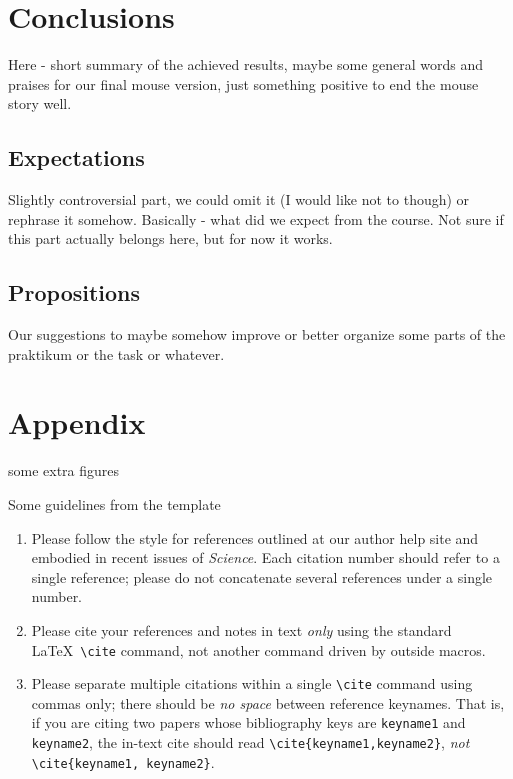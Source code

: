 \documentclass[12pt]{article}
\begin{document}
\section{Conclusions}
Here - short summary of the achieved results, maybe some general words and praises for our final mouse version, just something positive to end the mouse story well.

\subsection{Expectations}
Slightly controversial part, we could omit it (I would like not to though) or rephrase it somehow. Basically - what did we expect from the course. Not sure if this part actually belongs here, but for now it works.
\subsection{Propositions}
Our suggestions to maybe somehow improve or better organize some parts of the praktikum or the task or whatever.

\newpage
\section*{Appendix}
some extra figures

\vspace{3cm}





\newpage

Some guidelines from the template
\vspace{5cm}
\begin{enumerate}
\item Please follow the style for references outlined at our author
  help site and embodied in recent issues of {\it Science}.  Each
  citation number should refer to a single reference; please do not
  concatenate several references under a single number.
\item Please cite your references and notes in text {\it only\/} using
  the standard \LaTeX\ \verb+\cite+ command, not another command
  driven by outside macros.
\item Please separate multiple citations within a single \verb+\cite+
  command using commas only; there should be {\it no space\/}
  between reference keynames.  That is, if you are citing two
  papers whose bibliography keys are \texttt{keyname1} and
  \texttt{keyname2}, the in-text cite should read
  \verb+\cite{keyname1,keyname2}+, {\it not\/}
  \verb+\cite{keyname1, keyname2}+.
\end{enumerate}
\end{document}
